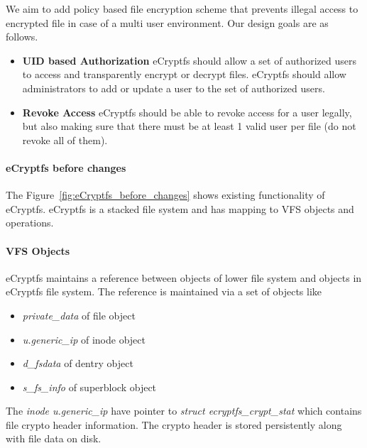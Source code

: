 
We aim to add policy based file encryption scheme that prevents
illegal access to encrypted file in case of a multi user environment.
Our design goals are as follows.
\begin{itemize}[leftmargin=*]
\item \textbf{UID based Authorization}
eCryptfs should allow a set of authorized users to access and
transparently encrypt or decrypt files.  eCryptfs should allow
administrators to add or update a user to the set of authorized users.
\item \textbf{Revoke Access}
eCryptfs should be able to revoke access for a user legally, but also
making sure that there must be at least 1 valid user per file (do not
revoke all of them).
\end{itemize}


\paragraph{eCryptfs before changes}
The Figure~\ref{fig:eCryptfs_before_changes} shows existing
functionality of eCryptfs.  eCryptfs is a stacked file system and has
mapping to VFS objects and operations.
\paragraph{VFS Objects}
eCryptfs maintains a reference between objects of lower file system
and objects in eCryptfs file system.  The reference is maintained via
a set of objects like
\begin{itemize}[leftmargin=*]
\item \emph{private\_data} of file object
\item \emph{u.generic\_ip} of inode object
\item \emph{d\_fsdata} of dentry object
\item \emph{s\_fs\_info} of superblock object
\end{itemize}
The \emph{inode u.generic\_ip} have pointer to \emph{struct
ecryptfs\_crypt\_stat} which contains file crypto header information.
The crypto header is stored persistently along with file data on disk.

